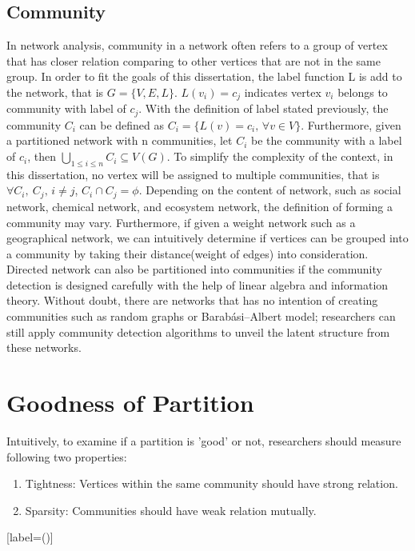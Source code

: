 \documentclass[12pt]{article}
\begin{document}
\subsection{Community}

In network analysis, community in a network often refers to a group of vertex that has closer relation comparing to other vertices that are not in the same group. In order to fit the goals of this dissertation, the label function L is add to the network, that is $G = \{V,E,L\}$. $L(v_i) = c_j$ indicates vertex $v_i$ belongs to community with label of $c_j$. With the definition of label stated previously, the community $C_i$ can be defined as $C_i = \{ L(v) = c_i \text{, } \forall v \in V \}$. Furthermore, given a partitioned network with n communities, let $C_i$ be the community with a label of $c_i$, then $\bigcup_{1 \leq i \leq n} C_i \subseteq V(G)$.  To simplify the complexity of the context, in this dissertation, no vertex will be assigned to multiple communities, that is $\forall C_i,\ C_j \text{, } i \neq j$, $C_i \cap C_j = \phi$. Depending on the content of network, such as social network, chemical network, and ecosystem network, the definition of forming a community may vary. Furthermore, if given a weight network such as a geographical network, we can intuitively determine if vertices can be grouped into a community by taking their distance(weight of edges) into consideration. Directed network can also be partitioned into communities if the community detection is designed carefully with the help of linear algebra and information theory\cite{4}. Without doubt, there are networks that has no intention of creating communities such as random graphs or Barabási–Albert model\cite{5}; researchers can still apply community detection algorithms to unveil the latent structure from these networks.

\section{Goodness of Partition}

Intuitively, to examine if a partition is 'good' or not, researchers should measure following two properties: 
\begin{enumerate}[label=(\alph*)]
\item Tightness: Vertices within the same community should have strong relation.
\item Sparsity: Communities should have weak relation mutually.
\end{enumerate}[label=(\alph*)]
\end{document}
